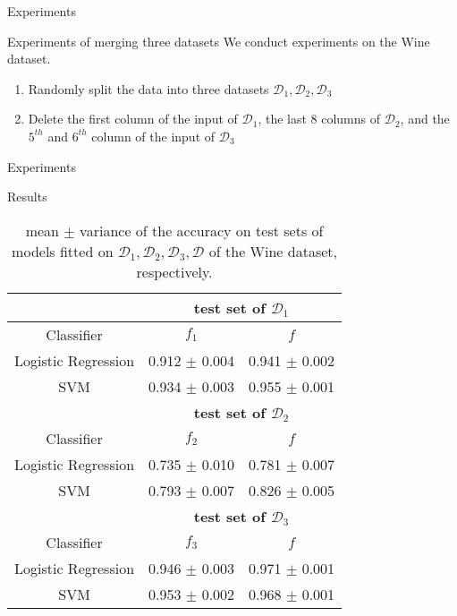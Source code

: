 \documentclass[xcolor={dvipsnames}]{beamer} %
\begin{document}
\begin{frame}{Experiments}
    \begin{block}{Experiments of merging three datasets}
    We conduct experiments on the Wine dataset.
    \begin{enumerate}
        \item Randomly split the data into three datasets $\mathcal{D}_1, \mathcal{D}_2, \mathcal{D}_3$
        \item Delete the first column of the input of $\mathcal{D}_1$, the last 8 columns of $\mathcal{D}_2$, and the $5^{th}$ and $6^{th}$ column of the input of $\mathcal{D}_3$
    \end{enumerate}
    \end{block}
\end{frame}
\begin{frame}{Experiments}
    \begin{block}{Results}
        \begin{table}[htbp]
\caption{mean $\pm$ variance of the accuracy on test sets of models fitted on $\mathcal{D}_1,\mathcal{D}_2, \mathcal{D}_3, \mathcal{D}$ of the Wine dataset, respectively.}
\label{tab-merge3}
\begin{center}
\small
\begin{tabular}{|c|c|c|}%
\hline
\multicolumn{1}{|c|}{}& \multicolumn{2}{|c|}{\bf test set of $\mathcal{D}_1$}\\ \hline 
\multicolumn{1}{|c|}{Classifier}& \multicolumn{1}{c}{\bf ${f}_1$}  &\multicolumn{1}{|c|}{\bf ${f}$}
\\ \hline 
Logistic Regression  & 0.912 $\pm$ 0.004 & 0.941 $\pm$ 0.002 \\\hline
SVM & 0.934 $\pm$ 0.003 & 0.955 $\pm$ 0.001\\\hline
\hline
\multicolumn{1}{|c|}{}& \multicolumn{2}{|c|}{\bf test set of $\mathcal{D}_2$}\\ \hline 
\multicolumn{1}{|c|}{Classifier}& \multicolumn{1}{c}{\bf ${f}_2$}  &\multicolumn{1}{|c|}{\bf ${f}$}
\\ \hline 
Logistic Regression  & 0.735 $\pm$ 0.010& 0.781 $\pm$ 0.007\\\hline
SVM & 0.793 $\pm$ 0.007& 0.826 $\pm$ 0.005 \\\hline
\hline
\multicolumn{1}{|c|}{}& \multicolumn{2}{|c|}{\bf test set of $\mathcal{D}_3$}\\ \hline 
\multicolumn{1}{|c|}{Classifier}&\multicolumn{1}{|c|}{\bf ${f}_3$} &\multicolumn{1}{|c|}{\bf ${f}$}
\\ \hline 
Logistic Regression &0.946 $\pm$ 0.003& 0.971 $\pm$ 0.001\\\hline
SVM &0.953 $\pm$ 0.002&0.968 $\pm$ 0.001\\\hline
\end{tabular}
\end{center}
\end{table}
    \end{block}
\end{frame}
\end{document}
